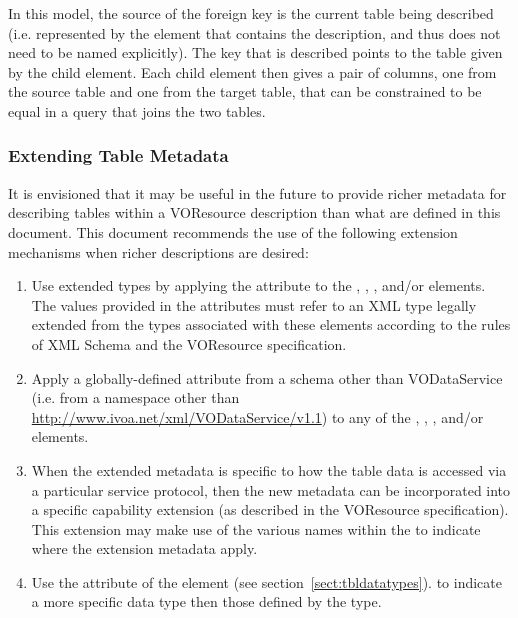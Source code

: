 \documentclass[11pt,a4paper]{ivoa}
\begin{document}


In this model, the source of the foreign
key is the current table being described (i.e. represented by the
 element that contains the
 description, and thus does not need to be
named explicitly).  The key that is described points to the table
given by the  child element.  Each child
 element then gives a pair of columns, one
from the source table and one from the target table, that can be
constrained to be equal in a query that joins the two tables.  






\subsubsection{Extending Table Metadata}
\label{sect:tblext}

It is envisioned that it may be useful in the future to provide richer
metadata for describing tables within a VOResource description than
what are defined in this document.  This document recommends the
use of the following extension mechanisms when richer descriptions are
desired:

\begin{enumerate}
\item Use extended types by applying the 
       attribute to the ,
       , , 
        and/or
        elements.  The values provided in the
       attributes must refer to an XML type legally extended from the types
       associated with these elements according to the rules of XML Schema
       \citep{std:XSD} and the VOResource specification.

\item Apply a globally-defined attribute from a schema other than
       VODataService (i.e. from a namespace other than
       \url{http://www.ivoa.net/xml/VODataService/v1.1}) to any of the
       , ,
       , and/or 
       elements.

\item When the extended metadata is specific to how the table data is
       accessed via a particular service protocol, then the new
       metadata can be incorporated into a specific capability
       extension (as described in the VOResource specification).  
       This extension may make use of the
       various names within the  to
       indicate where the extension metadata apply.

\item Use the  attribute of the
        element (see 
       section~\ref{sect:tbldatatypes}).
       to indicate a more specific data type then those defined by the
        type.
\end{enumerate}
\end{document}
